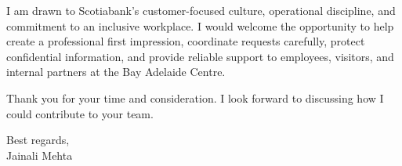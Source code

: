 \documentclass[letterpaper,11pt]{article}
\begin{document}
\bigbreak
I am drawn to Scotiabank's customer-focused culture, operational discipline, and commitment to an inclusive workplace. I would welcome the opportunity to help create a professional first impression, coordinate requests carefully, protect confidential information, and provide reliable support to employees, visitors, and internal partners at the Bay Adelaide Centre.

\bigbreak
Thank you for your time and consideration. I look forward to discussing how I could contribute to your team.

\bigbreak
Best regards,\\
Jainali Mehta
\end{document}
